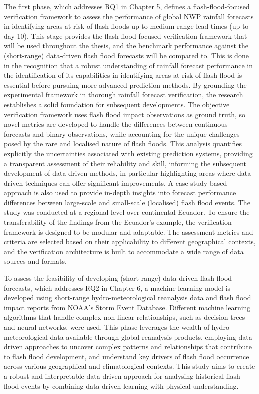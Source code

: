 The first phase, which addresses RQ1 in Chapter 5, defines a flash-flood-focused verification framework to assess the performance of global NWP rainfall forecasts in identifying areas at risk of flash floods up to medium-range lead times (up to day 10). This stage provides the flash-flood-focused verification framework that will be used throughout the thesis, and the benchmark performance against the (short-range) data-driven flash flood forecasts will be compared to. This is done in the recognition that a robust understanding of rainfall forecast performance in the identification of its capabilities in identifying areas at risk of flash flood is essential before pursuing more advanced prediction methods. By grounding the experimental framework in thorough rainfall forecast verification, the research establishes a solid foundation for subsequent developments. The objective verification framework uses flash flood impact observations as ground truth, so novel metrics are developed to handle the differences between continuous forecasts and binary observations, while accounting for the unique challenges posed by the rare and localised nature of flash floods. This analysis quantifies explicitly the uncertainties associated with existing prediction systems, providing a transparent assessment of their reliability and skill, informing the subsequent development of data-driven methods, in particular highlighting areas where data-driven techniques can offer significant improvements. A case-study-based approach is also used to provide in-depth insights into forecast performance differences between large-scale and small-scale (localised) flash flood events. The study was conducted at a regional level over continental Ecuador. To ensure the transferability of the findings from the Ecuador's example, the verification framework is designed to be modular and adaptable. The assessment metrics and criteria are selected based on their applicability to different geographical contexts, and the verification architecture is built to accommodate a wide range of data sources and formats. 



To assess the feasibility of developing (short-range) data-driven flash flood forecasts, which addresses RQ2 in Chapter 6, a machine learning model is developed using short-range hydro-meteorological reanalysis data and flash flood impact reports from NOAA's Storm Event Database. Different machine learning algorithms that handle complex non-linear relationships, such as decision trees and neural networks, were used. This phase leverages the wealth of hydro-meteorological data available through global reanalysis products, employing data-driven approaches to uncover complex patterns and relationships that contribute to flash flood development, and understand key drivers of flash flood occurrence across various geographical and climatological contexts. This study aims to create a robust and interpretable data-driven approach for analysing historical flash flood events by combining data-driven learning with physical understanding. 

